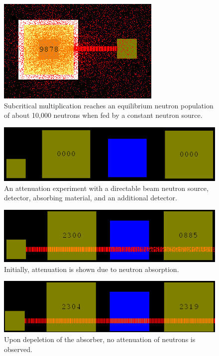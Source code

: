 \documentclass{anstrans}
\begin{document}
\begin{figure}
    \centering
    \includegraphics{subcrit-mult-equil.png}
    \caption{Subcritical multiplication reaches an equilibrium neutron population of about 10,000 neutrons when fed by a constant neutron source.}
    \label{fig:subcrit-equil}
\end{figure}

\begin{figure}
    \centering
    \includegraphics[width=\columnwidth]{atten-setup.png}
    \caption{An attenuation experiment with a directable beam neutron source,
      detector, absorbing material, and an additional detector.}
    \label{fig:atten-setup}
\end{figure}

\begin{figure}
    \centering
    \includegraphics[width=\columnwidth]{atten-on.png}
    \caption{Initially, attenuation is shown due to neutron absorption.}
    \label{fig:atten-on}
\end{figure}

\begin{figure}
    \centering
    \includegraphics[width=\columnwidth]{atten-done.png}
    \caption{Upon depeletion of the absorber, no attenuation of neutrons is observed.}
    \label{fig:atten-done}
\end{figure}
\end{document}
